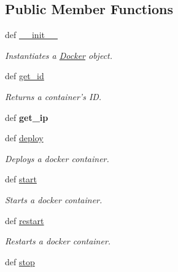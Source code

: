 \subsection*{Public Member Functions}
\begin{DoxyCompactItemize}
\item 
def \hyperlink{classhypervisor_1_1docker__driver_1_1Docker_a95faee6439e35695f424c61763b4077e}{\-\_\-\-\_\-init\-\_\-\-\_\-}
\begin{DoxyCompactList}\small\item\em Instantiates a \hyperlink{classhypervisor_1_1docker__driver_1_1Docker}{Docker} object. \end{DoxyCompactList}\item 
def \hyperlink{classhypervisor_1_1docker__driver_1_1Docker_aa6d1c57b5e6eb40c234af79445d5ccaa}{get\-\_\-id}
\begin{DoxyCompactList}\small\item\em Returns a container's I\-D. \end{DoxyCompactList}\item 
\hypertarget{classhypervisor_1_1docker__driver_1_1Docker_aaecff717c2e84fd0b8bf735e5f9a1f70}{def {\bfseries get\-\_\-ip}}\label{classhypervisor_1_1docker__driver_1_1Docker_aaecff717c2e84fd0b8bf735e5f9a1f70}

\item 
def \hyperlink{classhypervisor_1_1docker__driver_1_1Docker_ab7550e8839169bb0c1ba08050709f1a7}{deploy}
\begin{DoxyCompactList}\small\item\em Deploys a docker container. \end{DoxyCompactList}\item 
def \hyperlink{classhypervisor_1_1docker__driver_1_1Docker_ae22fe7316ede6ff4986ec8c911602e61}{start}
\begin{DoxyCompactList}\small\item\em Starts a docker container. \end{DoxyCompactList}\item 
\hypertarget{classhypervisor_1_1docker__driver_1_1Docker_a9455c971d4a2824d7ef8b0786b2d754b}{def \hyperlink{classhypervisor_1_1docker__driver_1_1Docker_a9455c971d4a2824d7ef8b0786b2d754b}{restart}}\label{classhypervisor_1_1docker__driver_1_1Docker_a9455c971d4a2824d7ef8b0786b2d754b}

\begin{DoxyCompactList}\small\item\em Restarts a docker container. \end{DoxyCompactList}\item 
\hypertarget{classhypervisor_1_1docker__driver_1_1Docker_a24338352bbdd29ceda701bae00f256c4}{def \hyperlink{classhypervisor_1_1docker__driver_1_1Docker_a24338352bbdd29ceda701bae00f256c4}{stop}}\label{classhypervisor_1_1docker__driver_1_1Docker_a24338352bbdd29ceda701bae00f256c4}


\end{DoxyCompactItemize}

